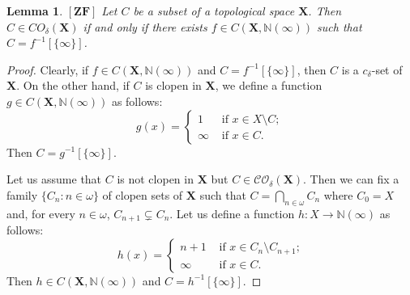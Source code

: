 \documentclass[12pt,twoside,leqno]{article}
\theoremstyle{plain}
\newtheorem{lemma}[theorem]{Lemma}
\theoremstyle{definition}
\theoremstyle{remark}
\begin{document}
\begin{lemma}
	\label{s6:l25}
	$[\mathbf{ZF}]$ Let $C$ be a subset of a topological space $\mathbf{X}$. Then $C\in CO_{\delta}(\mathbf{X})$  if and only if there exists $f\in C(\mathbf{X},\mathbb{N}(\infty))$ such that $C=f^{-1}[\{\infty\}]$.
\end{lemma}
\begin{proof}
	Clearly, if $f\in C(\mathbf{X}, \mathbb{N}(\infty))$ and $C=f^{-1}[\{\infty\}]$, then $C$ is a $c_{\delta}$-set of $\mathbf{X}$. On the other hand, if $C$ is clopen in $\mathbf{X}$, we define a function $g\in C(\mathbf{X}, \mathbb{N}(\infty))$ as follows:
	$$
	g(x)=\begin{cases} 1 &\text{ if } x\in X\setminus C;\\
		\infty &\text{ if } x\in C.\end{cases}
	$$
	\noindent Then $C=g^{-1}[\{\infty\}]$. 
	
	Let us assume that $C$ is not clopen in $\mathbf{X}$ but $C\in\mathcal{CO}_{\delta}(\mathbf{X})$. Then we can fix a family $\{C_n: n\in\omega\}$ of clopen sets of $\mathbf{X}$ such that  $C=\bigcap\limits_{n\in\omega}C_n$ where $C_0=X$ and, for every $n\in\omega$, $C_{n+1}\subsetneq C_n$. Let us define a function $h: X\to\mathbb{N}(\infty)$ as follows:
	$$
	h(x)=\begin{cases} n+1 &\text{ if $x\in C_n\setminus C_{n+1}$;}\\
		\infty &\text{ if $x\in C$.}\end{cases}
	$$
	Then $h\in C(\mathbf{X}, \mathbb{N}(\infty))$ and $C=h^{-1}[\{\infty\}]$. 
\end{proof}
\end{document}
